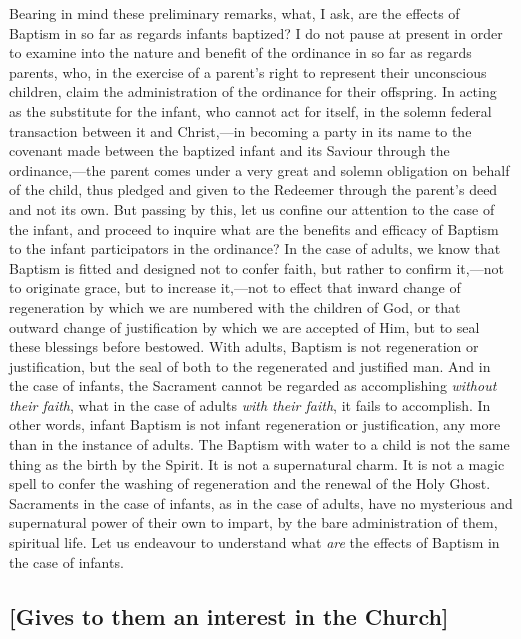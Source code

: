\documentclass[
  english,
]{book}
\begin{document}
Bearing in mind these preliminary remarks, what, I ask, are the effects of Baptism in so far as regards infants baptized? I do not pause at present in order to examine into the nature and benefit of the ordinance in so far as regards parents, who, in the exercise of a parent's right to represent their unconscious children, claim the administration of the ordinance for their offspring. In acting as the substitute for the infant, who cannot act for itself, in the solemn federal transaction between it and Christ,---in becoming a party in its name to the covenant made between the baptized infant and its Saviour through the ordinance,---the parent comes under a very great and solemn obligation on behalf of the child, thus pledged and given to the Redeemer through the parent's deed and not its own. But passing by this, let us confine our attention to the case of the infant, and proceed to inquire what are the benefits and efficacy of Baptism to the infant participators in the ordinance? In the case of adults, we know that Baptism is fitted and designed not to confer faith, but rather to confirm it,---not to originate grace, but to increase it,---not to effect that inward change of regeneration by which we are numbered with the children of God, or that outward change of justification by which we are accepted of Him, but to seal these blessings before bestowed. With adults, Baptism is not regeneration or justification, but the seal of both to the regenerated and justified man. And in the case of infants, the Sacrament cannot be regarded as accomplishing \emph{without their faith}, what in the case of adults \emph{with their faith}, it fails to accomplish. In other words, infant Baptism is not infant regeneration or justification, any more than in the instance of adults. The Baptism with water to a child is not the same thing as the birth by the Spirit. It is not a supernatural charm. It is not a magic spell to confer the washing of regeneration and the renewal of the Holy Ghost. Sacraments in the case of infants, as in the case of adults, have no mysterious and supernatural power of their own to impart, by the bare administration of them, spiritual life. Let us endeavour to understand what \emph{are} the effects of Baptism in the case of infants.

\hypertarget{gives-to-them-an-interest-in-the-church}{%
\subsection{{[}Gives to them an interest in the Church{]}}\label{gives-to-them-an-interest-in-the-church}}
\end{document}
